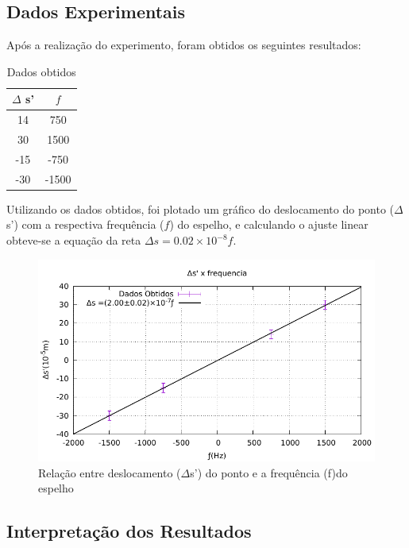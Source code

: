 \subsection{Dados Experimentais}
Após a realização do experimento, foram obtidos os seguintes resultados:
\begin{table}[h!]
\centering

\begin{tabular}{|	c	|	c	|}
\hline
$\Delta$ s' & $f$   \\ \hline
14          & 750   \\ \hline
30          & 1500  \\ \hline
-15         & -750  \\ \hline
-30         & -1500 \\ \hline
\end{tabular}
\caption{Dados obtidos}
\end{table}

Utilizando os dados obtidos, foi plotado um gráfico do deslocamento do ponto ($\Delta$s') com a respectiva frequência ($f$) do espelho, e calculando o
ajuste linear obteve-se a equação da reta $\Delta s
=0.02\times10^{-8}f$.


\begin{figure}[!h]
	\centering
		\includegraphics[scale= 1.1]{Graficusao/c.pdf}
	\caption{Relação entre deslocamento ($\Delta$s') do ponto e a frequência (f)do espelho }
\end{figure}

\subsection{Interpretação dos Resultados}

